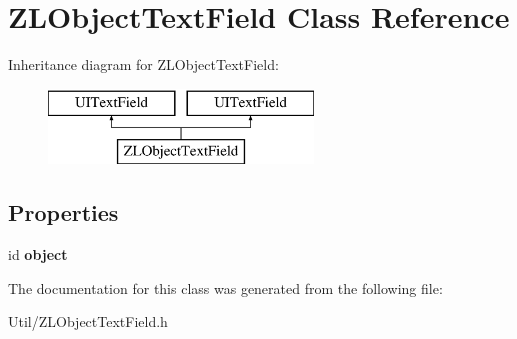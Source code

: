 \hypertarget{interface_z_l_object_text_field}{\section{Z\+L\+Object\+Text\+Field Class Reference}
\label{interface_z_l_object_text_field}
}
Inheritance diagram for Z\+L\+Object\+Text\+Field\+:\begin{figure}[H]
\begin{center}
\leavevmode
\includegraphics[height=2.000000cm]{interface_z_l_object_text_field}
\end{center}
\end{figure}
\subsection*{Properties}
\begin{DoxyCompactItemize}
\item 
\hypertarget{interface_z_l_object_text_field_afa177c78ec7c989d4f9b30c46b03b5c1}{id {\bfseries object}}\label{interface_z_l_object_text_field_afa177c78ec7c989d4f9b30c46b03b5c1}

\end{DoxyCompactItemize}


The documentation for this class was generated from the following file\+:\begin{DoxyCompactItemize}
\item 
Util/Z\+L\+Object\+Text\+Field.\+h\end{DoxyCompactItemize}

